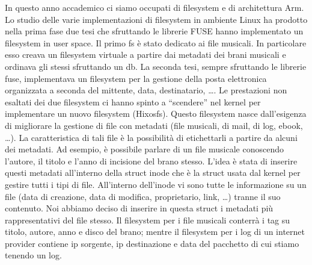 \documentclass[a4paper,12pt]{article}
\newcommand{\ua }{\`{u} }
\renewcommand{\aa }{\`{a} }
\newcommand{\ea }{\`{e} }
\begin{document}
In questo anno accademico ci siamo occupati di filesystem e di architettura Arm.
Lo studio delle varie implementazioni di filesystem in ambiente Linux ha prodotto nella prima fase due tesi che sfruttando le librerie FUSE hanno implementato un filesystem in user space.
Il primo fs \ea stato dedicato ai file musicali. In particolare esso creava un filesystem virtuale a partire dai metadati dei brani musicali e ordinava gli stessi sfruttando un db. La seconda tesi, sempre sfruttando le librerie fuse, implementava un filesystem per la gestione della posta elettronica organizzata a seconda del mittente, data, destinatario, \dots.
Le prestazioni non esaltati dei due filesystem ci hanno spinto a ``scendere'' nel kernel per implementare un nuovo filesystem (Hixosfs). Questo filesystem nasce dall'esigenza di migliorare la gestione di file con metadati (file musicali, di mail, di log, ebook, \dots). La caratteristica di tali file \ea la possibilit\aa di etichettarli a partire da alcuni dei metadati. Ad esempio, \ea possibile parlare di un file musicale conoscendo l'autore, il titolo e l'anno di incisione del brano stesso. L'idea \ea stata di inserire questi metadati all'interno della struct inode che \ea la struct usata dal kernel per gestire tutti i tipi di file. All'interno dell'inode vi sono tutte le informazione su un file (data di creazione, data di modifica, proprietario, link, \dots) tranne il suo contenuto. Noi abbiamo deciso di inserire in questa struct i metadati pi\ua rappresentativi del file stesso. Il filesystem per i file musicali conterr\aa i tag su titolo, autore, anno e disco del brano; mentre il filesystem per i log di un internet provider contiene ip sorgente, ip destinazione e data del pacchetto di cui stiamo tenendo un log.
\end{document}
